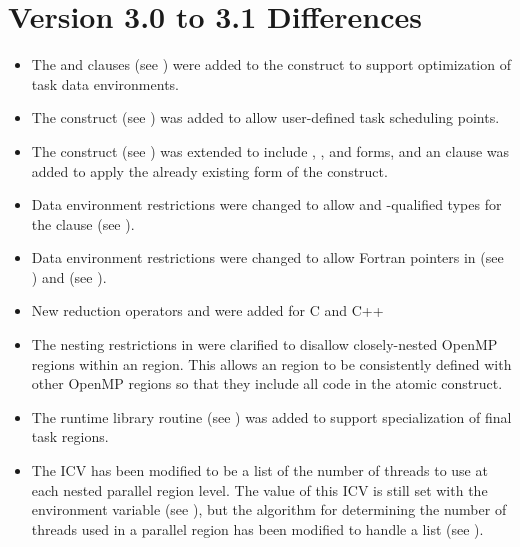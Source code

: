 \section{Version 3.0 to 3.1 Differences}
\label{sec:Version 3.0 to 3.1 Differences}
\begin{itemize}
\item The  and  clauses (see
) were added to
the  construct to support optimization of task data environments.

\item The  construct (see
) was added to allow
user-defined task scheduling points.

\item The  construct (see
) was extended to include
, , and  forms, and an  clause was added to apply
the already existing form of the  construct.

\item Data environment restrictions were changed to allow  and
-qualified types for the  clause (see
).

\item Data environment restrictions were changed to allow Fortran pointers in
 (see
)
and  (see
).

\item New reduction operators  and  were added for C and C++

\item The nesting restrictions in
 were clarified to disallow
closely-nested OpenMP regions within an  region. This allows an 
region to be consistently defined with other OpenMP regions so that they include all
code in the atomic construct.

\item The  runtime library routine (see
) was
added to support specialization of final task regions.

\item The  ICV has been modified to be a list of the number of threads to use
at each nested parallel region level. The value of this ICV is still set with the
 environment variable (see
), but the
algorithm for determining the number of threads used in a parallel region has been
modified to handle a list (see
).


\end{itemize}
